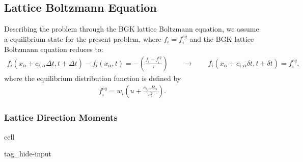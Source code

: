 \documentclass[letterpaper,10pt,english,openany,oneside]{jupyterBook}
\begin{document}
\subsection{Lattice Boltzmann Equation}
\label{\detokenize{LBM-Study/Convective-Equation:lattice-boltzmann-equation}}
\sphinxAtStartPar
Describing the problem through the BGK lattice Boltzmann equation, we assume a equilibrium state for the present problem, where \( f_{i}= f_{i}^{eq}\) and the BGK lattice Boltzmann equation reduces to:
\begin{equation}\label{equation:LBM-Study/Convective-Equation:LB-cv-Eq}
\begin{split}
f_{i}\left(x_{\alpha} + c_{i,\alpha} \Delta t, t+\Delta t\right)- f_{i}(x_{\alpha}, t)= -\left( \frac{ f_{i} - f_{i}^{eq} }{ \tau } \right) \quad \quad \rightarrow \quad \quad f_i( x_{\alpha} + c_{i,\alpha} \delta t, t+\delta t) = f_{i}^{eq} , 
\end{split}
\end{equation}
\sphinxAtStartPar
where the equilibrium distribution function is defined by
\begin{equation*}
\begin{split}
f^{eq}_{i} = w_{i}\left( u + \frac{c_{i,\alpha} B_{\alpha}}{c_{s}^{2}} \right).
\end{split}
\end{equation*}

\subsubsection{Lattice Direction Moments}
\label{\detokenize{LBM-Study/Convective-Equation:lattice-direction-moments}}
\begin{sphinxuseclass}{cell}
\begin{sphinxuseclass}{tag_hide-input}
\end{sphinxuseclass}
\end{sphinxuseclass}
\end{document}
